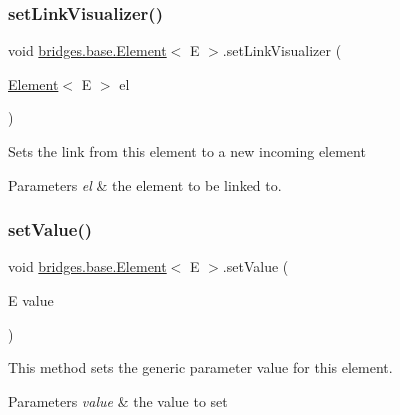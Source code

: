 \subsubsection{\texorpdfstring{set\+Link\+Visualizer()}{setLinkVisualizer()}}
{\footnotesize\ttfamily void \mbox{\hyperlink{classbridges_1_1base_1_1_element}{bridges.\+base.\+Element}}$<$ E $>$.set\+Link\+Visualizer (\begin{DoxyParamCaption}\item[{\mbox{\hyperlink{classbridges_1_1base_1_1_element}{Element}}$<$ E $>$}]{el }\end{DoxyParamCaption})\hspace{0.3cm}{\ttfamily [protected]}}

Sets the link from this element to a new incoming element


\begin{DoxyParams}{Parameters}
{\em el} & the element to be linked to. \\
\hline
\end{DoxyParams}
\mbox{\label{classbridges_1_1base_1_1_element_ab3cf1241da0bc4c59cea9d6f0fd7aaf4}} 
\subsubsection{\texorpdfstring{set\+Value()}{setValue()}}
{\footnotesize\ttfamily void \mbox{\hyperlink{classbridges_1_1base_1_1_element}{bridges.\+base.\+Element}}$<$ E $>$.set\+Value (\begin{DoxyParamCaption}\item[{E}]{value }\end{DoxyParamCaption})}

This method sets the generic parameter value for this element.


\begin{DoxyParams}{Parameters}
{\em value} & the value to set \\
\hline
\end{DoxyParams}
\mbox{\label{classbridges_1_1base_1_1_element_a5befa95788099f1bc72cdf5361c55bed}} 
